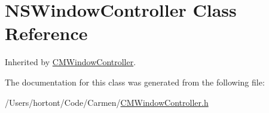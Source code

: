 \hypertarget{class_n_s_window_controller}{
\section{NSWindowController Class Reference}
\label{class_n_s_window_controller}
}
Inherited by \hyperlink{interface_c_m_window_controller}{CMWindowController}.



The documentation for this class was generated from the following file:\begin{CompactItemize}
\item 
/Users/hortont/Code/Carmen/\hyperlink{_c_m_window_controller_8h}{CMWindowController.h}\end{CompactItemize}
